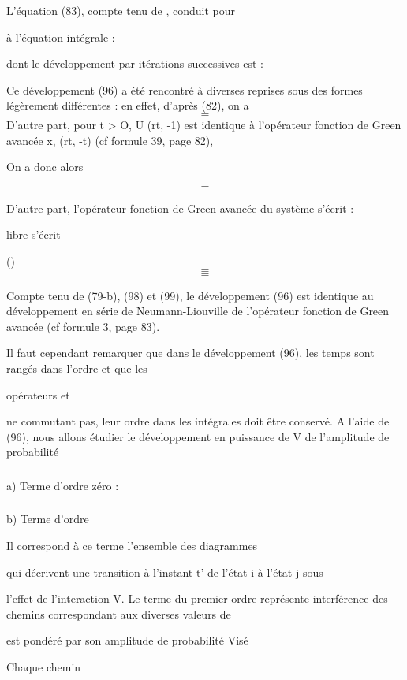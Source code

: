 L'équation (83), compte tenu de , conduit pour

%
 à l'équation intégrale :

dont le développement par itérations successives est :

Ce développement (96) a été rencontré à diverses reprises sous des
formes légèrement différentes : en effet, d'après (82), on a
\[
\tag{97}=
\]
D'autre part, pour t > O, U (rt, -1) est identique à l'opérateur
fonction de Green avancée x, (rt, -t) (cf formule 39, page 82),

On a donc alors

\[
\tag{98}=
\]

D'autre part, l'opérateur fonction de Green avancée du système
 s'écrit :

libre  s'écrit

()
\[
\tag{99}=
\]
\[
\tag{100}=
\]


Compte tenu de (79-b), (98) et (99), le développement (96) est identique au
développement en série de Neumann-Liouville de l'opérateur fonction de Green
avancée (cf formule 3, page 83).

Il faut cependant remarquer que dans le développement (96),
les temps sont rangés  dans l'ordre  et que les

opérateurs  et 

ne commutant pas, leur ordre dans les intégrales doit être conservé.
A l'aide de (96), nous allons étudier le développement en
puissance de V de l'amplitude de probabilité

\subsubsection{}%
a) Terme d'ordre zéro :

\subsubsection{}%
b) Terme d'ordre 

Il correspond à ce terme l'ensemble des diagrammes

qui décrivent une transition à l'instant t' de l'état i à l'état j sous

l'effet de l'interaction V. Le terme du premier ordre représente  interférence
des chemins correspondant aux diverses valeurs de 

est pondéré par son amplitude de probabilité  Visé

Chaque chemin

